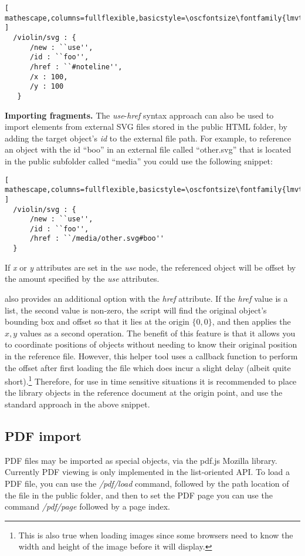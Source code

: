 \begin{minipage}{\linewidth}
\begin{lstlisting}[ mathescape,columns=fullflexible,basicstyle=\oscfontsize\fontfamily{lmvtt}\selectfont ]
  /violin/svg : {
      /new : ``use'',
      /id : ``foo'',
      /href : ``#noteline'',
      /x : 100,
      /y : 100
   }
 \end{lstlisting}
\end{minipage}

\medskip
\noindent
\textbf{Importing fragments.} 
The \textit{use}-\textit{href} syntax approach can also be used to import elements from external SVG files stored in the public HTML folder, by adding the target object's \textit{id} to the external file path.
For example, to reference an object with the id ``boo'' in an external file called ``other.svg'' that is located in the public subfolder called ``media'' you could use the following snippet:

\begin{lstlisting}[ mathescape,columns=fullflexible,basicstyle=\oscfontsize\fontfamily{lmvtt}\selectfont ]
  /violin/svg : {
      /new : ``use'',
      /id : ``foo'',
      /href : ``/media/other.svg#boo''
  }
 \end{lstlisting}

If \textit{x} or \textit{y} attributes are set in the \textit{use} node, the referenced object will be offset by the amount specified by the  \textit{use} attributes.

\drawsocket also provides an additional option with the \textit{href} attribute. If the \textit{href} value is a list, the second value is non-zero, the script will find the original object's bounding box and offset so that it lies at the origin $\{0,0\}$, and then applies the ${x,y}$ values as a second operation. The benefit of this feature is that it allows you to coordinate positions of objects without needing to know their original position in the reference file. However, this helper tool uses a callback function to perform the offset after first loading the file which does incur a slight delay (albeit quite short).\footnote{This is also true when loading images since some browsers need to know the width and height of the image before it will display.}
Therefore, for use in time sensitive situations it is recommended to place the library objects in the reference document at the origin point, and use the standard approach in the above snippet.

\subsection{PDF import}\label{sec:pdf}
PDF files may be imported as special \drawsocket objects, via the pdf.js Mozilla library.
Currently PDF viewing is only implemented in the list-oriented API. 
To load a PDF file, you can use the \textit{/pdf/load} command, followed by the path location of the file in the public folder, and then to set the PDF page you can use the command \textit{/pdf/page} followed by a page index.

